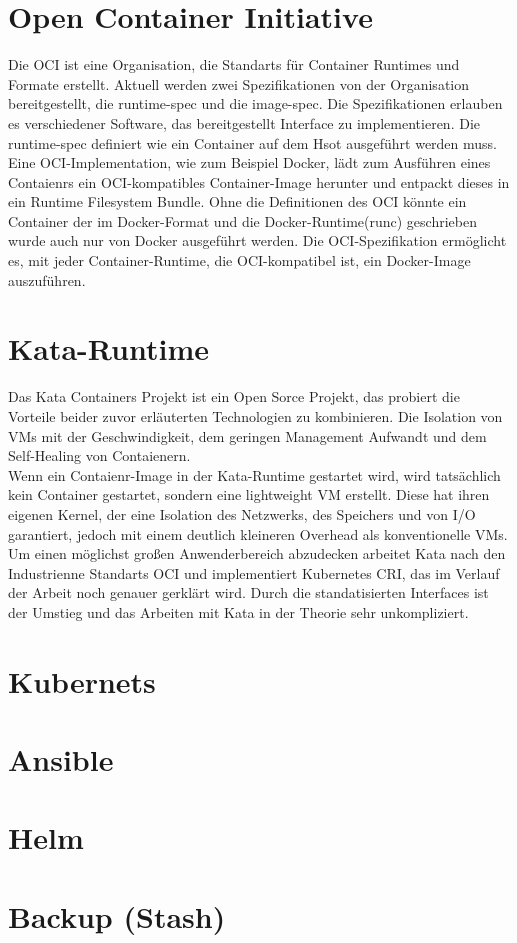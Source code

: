 \section{Open Container Initiative}
Die \ac{OCI} ist eine Organisation, die Standarts für Container Runtimes und Formate erstellt.
Aktuell werden zwei Spezifikationen von der Organisation bereitgestellt, die \ac{runtime-spec} und die \ac{image-spec}.
Die Spezifikationen erlauben es verschiedener Software, das bereitgestellt Interface zu implementieren.
Die \ac{runtime-spec} definiert wie ein Container auf dem Hsot ausgeführt werden muss. 
Eine \ac{OCI}-Implementation, wie zum Beispiel Docker, lädt zum Ausführen eines Contaienrs ein \ac{OCI}-kompatibles Container-Image herunter und entpackt dieses in ein Runtime Filesystem Bundle.
Ohne die Definitionen des \ac{OCI} könnte ein Container der im Docker-Format und die Docker-Runtime(runc) geschrieben wurde auch nur von Docker ausgeführt werden.
Die \ac{OCI}-Spezifikation ermöglicht es, mit jeder Container-Runtime, die \ac{OCI}-kompatibel ist, ein Docker-Image auszuführen. \cite{oci}



\section{Kata-Runtime}
Das Kata Containers Projekt ist ein Open Sorce Projekt, das probiert die Vorteile beider zuvor erläuterten Technologien zu kombinieren.
Die Isolation von \ac{VM}s mit der Geschwindigkeit, dem geringen Management Aufwandt und dem Self-Healing von Contaienern.
\\
Wenn ein Contaienr-Image in der Kata-Runtime gestartet wird, wird tatsächlich kein Container gestartet, sondern eine lightweight \ac{VM} erstellt.
Diese hat ihren eigenen Kernel, der eine Isolation des Netzwerks, des Speichers und von \ac{I/O} garantiert, jedoch mit einem deutlich kleineren Overhead als konventionelle \ac{VM}s.
Um einen möglichst großen Anwenderbereich abzudecken arbeitet Kata nach den Industrienne Standarts \ac{OCI} und implementiert Kubernetes \ac{CRI}, das im Verlauf der Arbeit noch genauer gerklärt wird. 
Durch die standatisierten Interfaces ist der Umstieg und das Arbeiten mit Kata in der Theorie sehr unkompliziert. \cite{kata}


\section{Kubernets}

\section{Ansible}

\section{Helm}

\section{Backup (Stash)} 